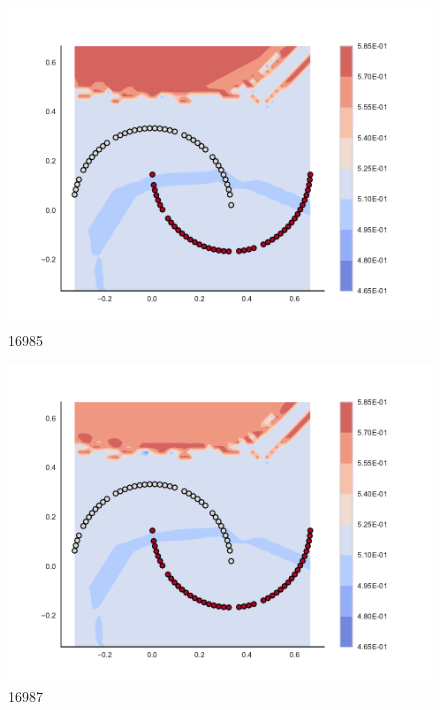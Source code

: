 \begin{subfigure}[b]{0.09\textwidth}
    \includegraphics[clip, trim=2.35cm 1.75cm 4.5cm 0cm,width=\textwidth]{img/convergence/16985.pdf}
    \caption{16985}
    \label{fig:convergence_16985}
\end{subfigure}
%
\begin{subfigure}[b]{0.09\textwidth}
    \includegraphics[clip, trim=2.35cm 1.75cm 4.5cm 0cm,width=\textwidth]{img/convergence/16987.pdf}
    \caption{16987}
    \label{fig:convergence_16987}
\end{subfigure}
%
